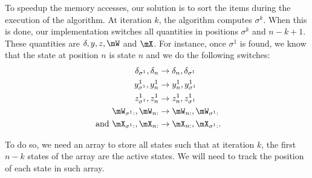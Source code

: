 \begin{subappendices}
To speedup the memory accesses, our solution is to sort the items during the execution of the algorithm. At iteration $k$, the algorithm computes $\sigma^{k}$. When this is done, our implementation switches all quantities in positions $\sigma^{k}$ and $n-k+1$. These quantities are $\delta, y, z, \mW$ and $\mX$. For instance, once $\sigma^1$ is found, we know that the state at position $n$ is state $n$ and we do the following switches:
\begin{align*}
    \delta_{\sigma^1}, \delta_{n} &\rightarrow \delta_{n}, \delta_{\sigma^1} \\
    y^1_{\sigma^1}, y^1_{n} &\rightarrow y^1_{n}, y^1_{\sigma^1} \\
    z^1_{\sigma^1}, z^1_{n} &\rightarrow z^1_{n}, z^1_{\sigma^1} \\
    \mW_{\sigma^1 :}, \mW_{n :} &\rightarrow \mW_{n:}, \mW_{\sigma^1:} \\
    \text{ and } \mX_{\sigma^1 :}, \mX_{n :} &\rightarrow \mX_{n :}, \mX_{\sigma^1 :}.
\end{align*}

To do so, we need an array to store all states such that at iteration $k$, the first $n-k$ states of the array are the active states. We will need to track the position of each state in such array.


\end{subappendices}
